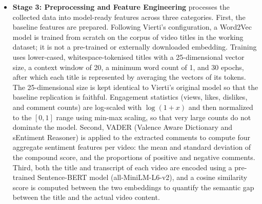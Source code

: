 \documentclass[conference]{IEEEtran}
\begin{document}
\begin{itemize}
    An extraction process was then initiated for the 5,722 confirmed videos. Comment extraction was performed via the YouTube Data API v3 commentThreads.list endpoint, retrieving up to 100 top-level comments per video sorted by relevance. The extractor implements append-mode checkpointing to a running CSV, allowing interrupted runs to resume without duplicating requests. API key rotation is applied automatically on quota exhaustion (HTTP 403), and exponential backoff beginning at 2 seconds with a ceiling of 60 seconds is applied on transient server errors (HTTP 429 and 5xx). Permanent failures (disabled comments, deleted videos) are logged separately and excluded from further processing. Transcript extraction was performed using youtube-transcript-api with a browser-spoofed HTTP session to reduce IP-based rate limiting. Where both manually-created and auto-generated transcripts are available, the manually-created transcript is preferred; otherwise the auto-generated transcript is selected. Requests are spaced with a randomised delay of 4–8 seconds per video. Consecutive IP block events beyond a threshold of five trigger an automatic abort, with blocked video IDs logged to a separate file for retry from an alternative network. The output of this stage, comments.csv and transcripts.csv, is then used in the subsequent preprocessing stage.
 
    \item \textbf{Stage 3: Preprocessing and Feature Engineering} processes the collected data into model-ready features across three categories. First, the baseline features are prepared. Following Vierti's configuration, a Word2Vec model is trained from scratch on the corpus of video titles in the working dataset; it is not a pre-trained or externally downloaded embedding. Training uses lower-cased, whitespace-tokenised titles with a 25-dimensional vector size, a context window of 20, a minimum word count of 1, and 30 epochs, after which each title is represented by averaging the vectors of its tokens. The 25-dimensional size is kept identical to Vierti's original model so that the baseline replication is faithful. Engagement statistics (views, likes, dislikes, and comment counts) are log-scaled with $\log(1+x)$ and then normalized to the $[0,1]$ range using min-max scaling, so that very large counts do not dominate the model. Second, VADER (Valence Aware Dictionary and sEntiment Reasoner) is applied to the extracted comments to compute four aggregate sentiment features per video: the mean and standard deviation of the compound score, and the proportions of positive and negative comments. Third, both the title and transcript of each video are encoded using a pre-trained Sentence-BERT model (all-MiniLM-L6-v2), and a cosine similarity score is computed between the two embeddings to quantify the semantic gap between the title and the actual video content.
 

\end{itemize}
\end{document}
